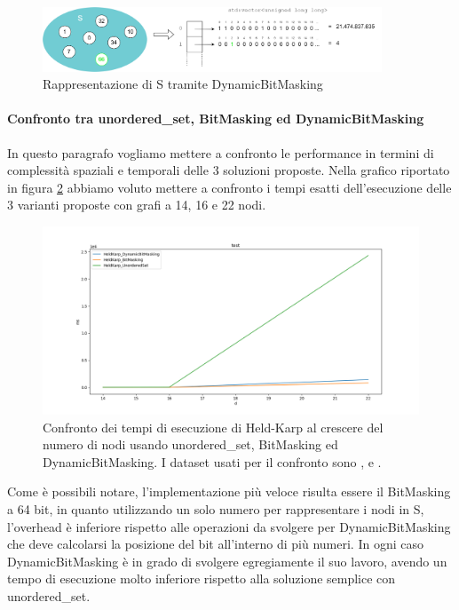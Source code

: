 \begin{figure}[h]
	\centering
	\includegraphics[width=0.9\textwidth]{./images/BitMaskingExtended Example.png}
	\caption{Rappresentazione di S tramite DynamicBitMasking}
	\label{fig:DynamicBitMasking-example}
\end{figure}

\paragraph{Confronto tra unordered\_set, BitMasking ed DynamicBitMasking}
In questo paragrafo vogliamo mettere a confronto le performance in termini di complessità spaziali e temporali delle 3 soluzioni proposte. Nella grafico riportato in figura \ref{fig:UnorderedvsDynamicBitMasking} abbiamo voluto mettere a confronto i tempi esatti dell'esecuzione delle 3 varianti proposte con grafi a 14, 16 e 22 nodi.

\begin{figure}[h]
	\centering
	\includegraphics[width=1\textwidth]{./images/unorderedSet vs BitMasking.png}
	\caption{Confronto dei tempi di esecuzione di Held-Karp al crescere del numero di nodi usando unordered\_set, BitMasking ed DynamicBitMasking. I dataset usati per il confronto sono ,  e .}
	\label{fig:UnorderedvsDynamicBitMasking}
\end{figure}

Come è possibili notare, l'implementazione più veloce risulta essere il BitMasking a 64 bit, in quanto utilizzando un solo numero per rappresentare i nodi in S, l'overhead è inferiore rispetto alle operazioni da svolgere per DynamicBitMasking che deve calcolarsi la posizione del bit all'interno di più numeri. In ogni caso DynamicBitMasking è in grado di svolgere egregiamente il suo lavoro, avendo un tempo di esecuzione molto inferiore rispetto alla soluzione semplice con unordered\_set.

